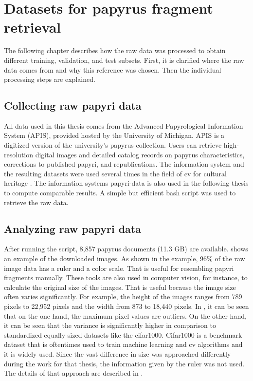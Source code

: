\chapter{Datasets for papyrus fragment retrieval}
\label{chap:Datasets}

The following chapter describes how the raw data was processed to obtain different training, validation, and test subsets. First, it is clarified where the raw data comes from and why this reference was chosen. Then the individual processing steps are explained. 

\section{Collecting raw papyri data}
All data used in this thesis comes from the Advanced Papyrological Information System (APIS), provided hosted by the University of Michigan. APIS is a digitized version of the university's papyrus collection. Users can retrieve high-resolution digital images and detailed catalog records on papyrus characteristics, corrections to published papyri, and republications.
The information system and the resulting datasets were used several times in the field of \ac{cv} for cultural heritage \cite{Pirrone21, Ostertag21}. The information systems papyri-data is also used in the following thesis to compute comparable results. A simple but efficient bash script was used to retrieve the raw data.
 

\section{Analyzing raw papyri data}
After running the script, 8,857 papyrus documents (11.3 GB) are available.  shows an example of the downloaded images. As shown in the example, 96\% of the raw image data has a ruler and a color scale. That is useful for resembling papyri fragments manually. These tools are also used in computer vision, for instance, to calculate the original size of the images. That is useful because the image size often varies significantly. For example, the height of the images ranges from 789 pixels to 22,952 pixels and the width from 873 to 18,440 pixels. In , it can be seen that on the one hand, the maximum pixel values are outliers. On the other hand, it can be seen that the variance is significantly higher in comparison to standardized equally sized datasets like the cifar1000. Cifar1000 is a benchmark dataset that is oftentimes used to train machine learning and \ac{cv} algorithms and it is widely used. Since the vast difference in size was approached differently during the work for that thesis, the information given by the ruler was not used. The details of that approach are described in . 

